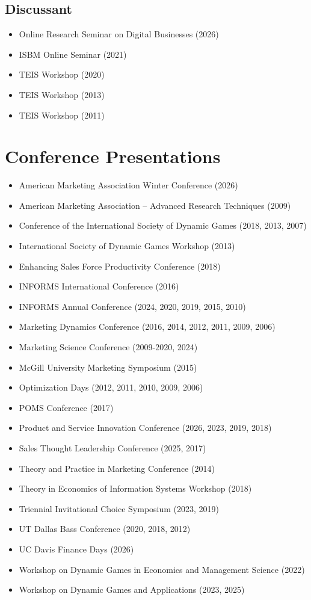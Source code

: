 \documentclass[10pt]{article}
\begin{document}
\subsection{Discussant}
\begin{itemize}
\item[] Online Research Seminar on Digital Businesses (2026)
\item[] ISBM Online Seminar (2021)
\item[] TEIS Workshop (2020) 
 \item[] TEIS Workshop (2013) 
 \item[] TEIS Workshop (2011) 
\end{itemize}

\section{Conference Presentations}

\begin{itemize}
\item[] American Marketing Association Winter Conference (2026)
\item[] American Marketing Association -- Advanced Research Techniques (2009)
\item[] Conference of the International Society of Dynamic Games (2018, 2013, 2007)
\item[] International Society of Dynamic Games Workshop (2013)  
\item[] Enhancing Sales Force Productivity Conference (2018)  
\item[] INFORMS International Conference (2016) 
\item[] INFORMS Annual Conference (2024, 2020, 2019, 2015, 2010) 
\item[] Marketing Dynamics Conference  (2016, 2014, 2012, 2011, 2009, 2006)
\item[] Marketing Science Conference (2009-2020, 2024)
\item[] McGill University Marketing Symposium (2015) 
\item[] Optimization Days (2012, 2011, 2010, 2009, 2006) 
\item[] POMS Conference (2017) 
\item[] Product and Service Innovation Conference (2026, 2023, 2019, 2018) 
\item[] Sales Thought Leadership Conference (2025, 2017) 
\item[] Theory and Practice in Marketing Conference (2014) 
\item[] Theory in Economics of Information Systems Workshop (2018) 
\item[] Triennial Invitational Choice Symposium  (2023, 2019)
\item[] UT Dallas Bass Conference (2020, 2018, 2012) 
\item[] UC Davis Finance Days (2026)
\item[] Workshop on Dynamic Games in Economics and Management Science (2022)
\item[] Workshop on Dynamic Games and Applications (2023, 2025)
\end{itemize}
\end{document}
